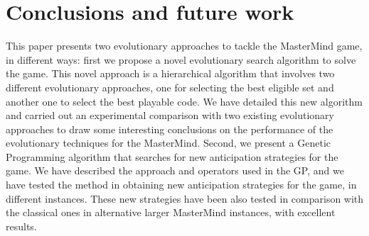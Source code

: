 

\section{Conclusions and future work}\label{Conclusions}

This paper presents two evolutionary approaches to tackle the MasterMind game, in different ways: first
we propose a novel evolutionary search algorithm to solve the game. This novel approach is
a hierarchical algorithm that involves two different evolutionary approaches,
one for selecting the best eligible set and another one to select the best playable
code. We have detailed this new algorithm and carried out an experimental
comparison with two existing evolutionary approaches to draw some interesting
conclusions on the performance of the evolutionary techniques for the
MasterMind. Second, we present a Genetic Programming algorithm that searches for
new anticipation strategies for the game. We have described the approach and
operators used in the GP, and we have tested the method in obtaining new anticipation
strategies for the game, in different instances. These new strategies have been also
tested in comparison with the classical ones in alternative larger MasterMind instances,
with excellent results.

